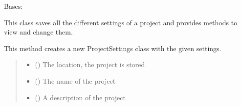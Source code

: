 \documentclass[letterpaper,10pt,english]{sphinxmanual}
\begin{document}
\begin{fulllineitems}
\label{\detokenize{apidoc/src.osm_configurator.model.project:src.osm_configurator.model.project.project_settings.ProjectSettings}}
\pysigstartsignatures
{}
\pysigstopsignatures
\sphinxAtStartPar
Bases: 

\sphinxAtStartPar
This class saves all the different settings of a project and provides methods to view and change them.

\begin{fulllineitems}
\label{\detokenize{apidoc/src.osm_configurator.model.project:src.osm_configurator.model.project.project_settings.ProjectSettings.__init__}}
\pysigstartsignatures
{}
\pysigstopsignatures
\sphinxAtStartPar
This method creates a new ProjectSettings class with the given settings.
\begin{quote}\begin{description}
\begin{itemize}
\item {} 
\sphinxAtStartPar
{} () \textendash{} The location, the project is stored

\item {} 
\sphinxAtStartPar
{} () \textendash{} The name of the project

\item {} 
\sphinxAtStartPar
{} () \textendash{} A description of the project


\end{itemize}
\end{description}
\end{quote}
\end{fulllineitems}
\end{fulllineitems}
\end{document}

